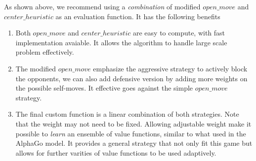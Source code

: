 \documentclass[11pt]{article}
\begin{document}
As shown above, we recommend using a \emph{combination} of modified $open\_move$ and $center\_heuristic$ as an evaluation function. It has the following benefits
\begin{enumerate}
\item Both $open\_move$ and $center\_heuristic$ are easy to compute, with fast implementation avaiable. It allows the algorithm to handle large scale problem effectively. 
\item The modified $open\_move$ emphasize the aggressive strategy to actively block the opponents, we can also add defensive version by adding more weights on the possible self-moves. It effective goes against the simple $open\_move$ strategy.
\item The final custom function is a linear combination of both strategies. Note that the weight may not need to be fixed. Allowing adjustable weight make it possible to \emph{learn} an ensemble of value functions, similar to what used in the AlphaGo model. It provides a general strategy that not only fit this game but allows for further varities of value functions to be used adaptively. 
\end{enumerate}
\end{document}
